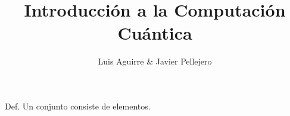 \documentclass{beamer}
\title[Computación Cuántica]{Introducción a la Computación Cuántica}
\author{Luis Aguirre \& Javier Pellejero}
\institute{Universidad Complutense de Madrid} %
\begin{document}
\begin{frame}
\titlepage
\end{frame}

\begin{frame}
	\begin{block}{Def.}
		Un \alert{conjunto} consiste de elementos.
	\end{block}
\end{frame}
\end{document}

